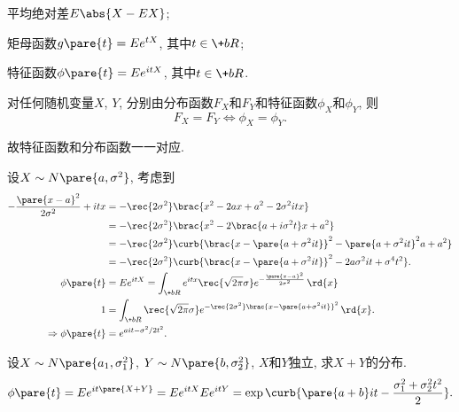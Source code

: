 \documentclass[../Statistics.tex]{subfiles}
\begin{document}
\begin{cenum}
    \item 平均绝对差$E\abs{X-EX}$;
    \item 矩母函数$g\pare{t} = Ee^{tX}$, 其中$t\in \+bR$;
    \item 特征函数$\phi\pare{t} = Ee^{itX}$, 其中$t\in \+bR$.
\end{cenum}
\begin{theorem}
    对任何随机变量$X$, $Y$, 分别由分布函数$F_X$和$F_Y$和特征函数$\phi_X$和$\phi_Y$, 则
    \[ F_X = F_Y \Leftrightarrow \phi_X = \phi_Y. \]
\end{theorem}
故特征函数和分布函数一一对应.
\begin{sample}
    \begin{ex}
        设$X\sim N\pare{a,\sigma^2}$, 考虑到
        \begin{align*}
            -\frac{\pare{x-a}^2}{2\sigma^2} + itx &= -\rec{2\sigma^2} \brac{x^2 - 2ax + a^2 - 2\sigma^2 itx} \\
            &= -\rec{2\sigma^2} \brac{x^2 - 2\brac{a+i\sigma^2 t}x + a^2} \\
            &= -\rec{2\sigma^2} \curb{\brac{x-\pare{a+\sigma^2 it}}^2 - \pare{a+\sigma^2it}^2 a+ a^2} \\
            &= -\rec{2\sigma^2} \curb{\brac{x-\pare{a+\sigma^2 it}}^2 - 2a\sigma^2 it + \sigma^4t^2}.\\
            \phi\pare{t} &= Ee^{itX} = \int_{\+bR} e^{itx} \rec{\sqrt{2\pi}\sigma} e^{-\frac{\pare{x-a}^2}{2\sigma^2}}\,\rd{x} \\
            1 &= \int_{\+bR} \rec{\sqrt{2\pi}\sigma}e^{-\rec{2\sigma^2}\brac{x-\pare{a+\sigma^2it}}^2}\,\rd{x}.\\
            \Rightarrow \phi\pare{t} &= e^{ait - \sigma^2/2t^2}.
        \end{align*}
    \end{ex}
\end{sample}
\begin{sample}
    \begin{ex}
        设$X\sim N\pare{a_1,\sigma_1^2}$, $Y\sim N\pare{b,\sigma_2^2}$, $X$和$Y$独立, 求$X+Y$的分布.
        \[ \displaystyle \phi\pare{t} = Ee^{it\pare{X+Y}} = Ee^{itX}Ee^{itY} = \exp\curb{\pare{a+b}it - \frac{\sigma_1^2 + \sigma_2^2t^2}{2}}. \]
    \end{ex}
\end{sample}


\end{document}
